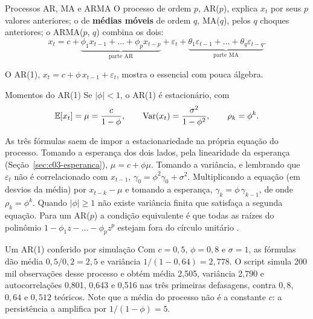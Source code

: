 \begin{definicao}{Processos AR, MA e ARMA}
O processo  de ordem $p$, AR($p$), explica $x_t$ por seus $p$ valores anteriores; o de \textbf{médias móveis} de ordem $q$, MA($q$), pelos $q$ choques anteriores; o ARMA($p$, $q$) combina os dois:
\begin{equation}
  x_t = c + \underbrace{\phi_1 x_{t-1} + \dots + \phi_p x_{t-p}}_{\text{parte AR}} + \varepsilon_t + \underbrace{\theta_1 \varepsilon_{t-1} + \dots + \theta_q \varepsilon_{t-q}}_{\text{parte MA}} .
  \label{eq:c06-arma}
\end{equation}
\end{definicao}

O AR(1), $x_t = c + \phi\,x_{t-1} + \varepsilon_t$, mostra o essencial com pouca álgebra.

\begin{resultado}{Momentos do AR(1)}
Se $|\phi| < 1$, o AR(1) é estacionário, com
\begin{equation}
  \operatorname{\mathbb{E}}[x_t] = \mu = \frac{c}{1-\phi} , \qquad \operatorname{Var}(x_t) = \frac{\sigma^2}{1-\phi^2} , \qquad \rho_k = \phi^k .
  \label{eq:c06-ar1}
\end{equation}
\end{resultado}

As três fórmulas saem de impor a estacionariedade na própria equação do processo. Tomando a esperança dos dois lados, pela linearidade da esperança (Seção~\ref{sec:c03-esperanca}), $\mu = c + \phi\mu$. Tomando a variância, e lembrando que $\varepsilon_t$ não é correlacionado com $x_{t-1}$, $\gamma_0 = \phi^2\gamma_0 + \sigma^2$. Multiplicando a equação (em desvios da média) por $x_{t-k} - \mu$ e tomando a esperança, $\gamma_k = \phi\,\gamma_{k-1}$, de onde $\rho_k = \phi^k$. Quando $|\phi| \ge 1$ não existe variância finita que satisfaça a segunda equação. Para um AR($p$) a condição equivalente é que todas as raízes do polinômio $1 - \phi_1 z - \dots - \phi_p z^p$ estejam fora do círculo unitário \citep{hamilton1994}.

\begin{exemplo}{Um AR(1) conferido por simulação}
Com $c = 0,5$, $\phi = 0,8$ e $\sigma = 1$, as fórmulas dão média $0,5/0,2 = 2,5$ e variância $1/(1 - 0,64) = 2,778$. O script  simula 200 mil observações desse processo e obtém média 2,505, variância 2,790 e autocorrelações 0,801, 0,643 e 0,516 nas três primeiras defasagens, contra $0,8$, $0,64$ e $0,512$ teóricos. Note que a média do processo não é a constante $c$: a persistência a amplifica por $1/(1-\phi) = 5$.
\end{exemplo}

